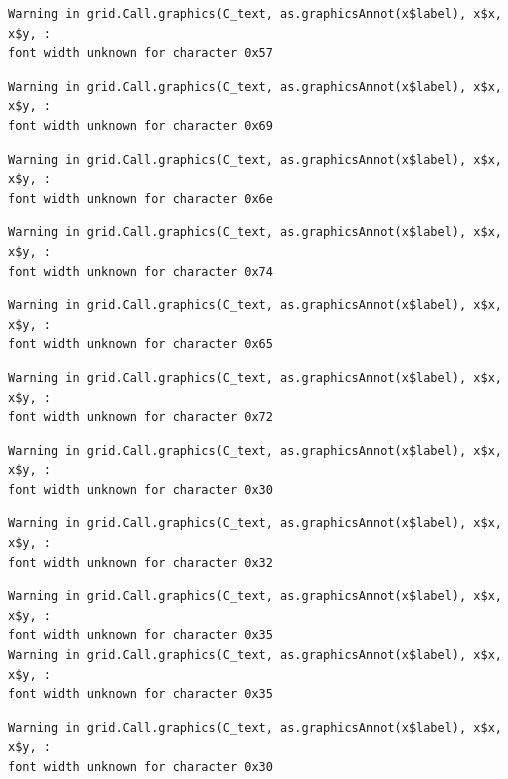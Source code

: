 \documentclass[
  letterpaper,
]{scrbook}
\begin{document}
\begin{verbatim}
Warning in grid.Call.graphics(C_text, as.graphicsAnnot(x$label), x$x, x$y, :
font width unknown for character 0x57
\end{verbatim}

\begin{verbatim}
Warning in grid.Call.graphics(C_text, as.graphicsAnnot(x$label), x$x, x$y, :
font width unknown for character 0x69
\end{verbatim}

\begin{verbatim}
Warning in grid.Call.graphics(C_text, as.graphicsAnnot(x$label), x$x, x$y, :
font width unknown for character 0x6e
\end{verbatim}

\begin{verbatim}
Warning in grid.Call.graphics(C_text, as.graphicsAnnot(x$label), x$x, x$y, :
font width unknown for character 0x74
\end{verbatim}

\begin{verbatim}
Warning in grid.Call.graphics(C_text, as.graphicsAnnot(x$label), x$x, x$y, :
font width unknown for character 0x65
\end{verbatim}

\begin{verbatim}
Warning in grid.Call.graphics(C_text, as.graphicsAnnot(x$label), x$x, x$y, :
font width unknown for character 0x72
\end{verbatim}

\begin{verbatim}
Warning in grid.Call.graphics(C_text, as.graphicsAnnot(x$label), x$x, x$y, :
font width unknown for character 0x30
\end{verbatim}

\begin{verbatim}
Warning in grid.Call.graphics(C_text, as.graphicsAnnot(x$label), x$x, x$y, :
font width unknown for character 0x32
\end{verbatim}

\begin{verbatim}
Warning in grid.Call.graphics(C_text, as.graphicsAnnot(x$label), x$x, x$y, :
font width unknown for character 0x35
Warning in grid.Call.graphics(C_text, as.graphicsAnnot(x$label), x$x, x$y, :
font width unknown for character 0x35
\end{verbatim}

\begin{verbatim}
Warning in grid.Call.graphics(C_text, as.graphicsAnnot(x$label), x$x, x$y, :
font width unknown for character 0x30
\end{verbatim}
\end{document}
